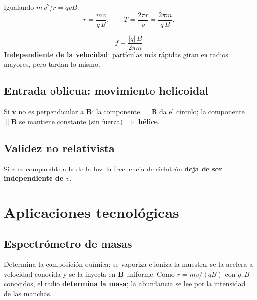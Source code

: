 \documentclass[12pt,a4paper]{article}
\begin{document}
Igualando $m\,v^2/r = qvB$:
\[
\boxed{r = \frac{m\,v}{q\,B}}, \qquad
T = \frac{2\pi r}{v} = \boxed{\frac{2\pi m}{q\,B}}.
\]

\begin{keybox}
  \[
  \boxed{f = \frac{|q|\,B}{2\pi m}}
  \]
  \textbf{Independiente de la velocidad}: partículas más rápidas giran en
  radios mayores, pero tardan lo mismo.
\end{keybox}



\subsection{Entrada oblicua: movimiento helicoidal}

Si $\mathbf{v}$ no es perpendicular a $\mathbf{B}$: la componente
$\perp\mathbf{B}$ da el círculo; la componente $\parallel\mathbf{B}$ se
mantiene constante (sin fuerza) $\Rightarrow$ \textbf{hélice}.



\subsection{Validez no relativista}

\begin{warnbox}[Relativista]
  Si $v$ es comparable a la de la luz, la frecuencia de ciclotrón
  \textbf{deja de ser independiente de $v$}.
\end{warnbox}

\section{Aplicaciones tecnológicas}

\subsection{Espectrómetro de masas}

Determina la composición química: se vaporiza e ioniza la muestra, se la
acelera a velocidad conocida y se la inyecta en $\mathbf{B}$ uniforme.
Como $r = mv/(qB)$ con $q,B$ conocidos, el radio \textbf{determina la
masa}; la abundancia se lee por la intensidad de las manchas.


\end{document}
